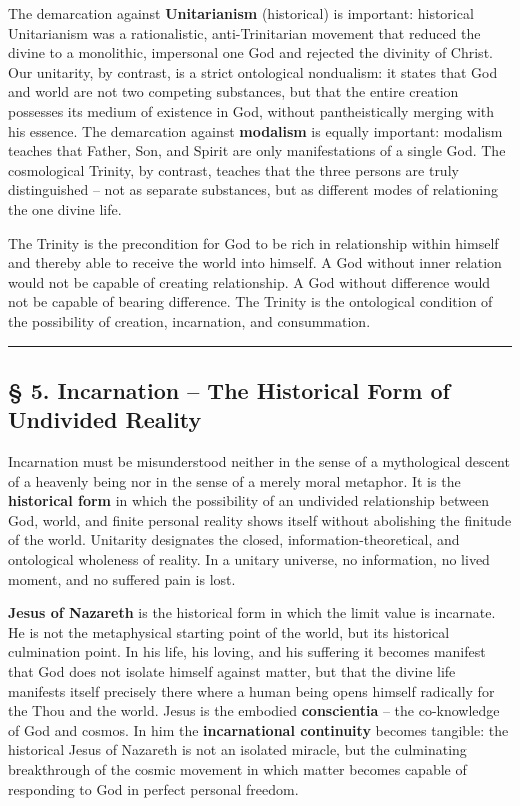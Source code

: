 \documentclass[
  english,
]{article}
\begin{document}
The demarcation against \textbf{Unitarianism} (historical) is important:
historical Unitarianism was a rationalistic, anti-Trinitarian movement
that reduced the divine to a monolithic, impersonal one God and rejected
the divinity of Christ. Our unitarity, by contrast, is a strict
ontological nondualism: it states that God and world are not two
competing substances, but that the entire creation possesses its medium
of existence in God, without pantheistically merging with his essence.
The demarcation against \textbf{modalism} is equally important: modalism
teaches that Father, Son, and Spirit are only manifestations of a single
God. The cosmological Trinity, by contrast, teaches that the three
persons are truly distinguished -- not as separate substances, but as
different modes of relationing the one divine life.

The Trinity is the precondition for God to be rich in relationship
within himself and thereby able to receive the world into himself. A God
without inner relation would not be capable of creating relationship. A
God without difference would not be capable of bearing difference. The
Trinity is the ontological condition of the possibility of creation,
incarnation, and consummation.

\begin{center}\rule{0.5\linewidth}{0.5pt}\end{center}

\subsection{§ 5. Incarnation -- The Historical Form of Undivided
Reality}\label{incarnation-the-historical-form-of-undivided-reality}

Incarnation must be misunderstood neither in the sense of a mythological
descent of a heavenly being nor in the sense of a merely moral metaphor.
It is the \textbf{historical form} in which the possibility of an
undivided relationship between God, world, and finite personal reality
shows itself without abolishing the finitude of the world. Unitarity
designates the closed, information-theoretical, and ontological
wholeness of reality. In a unitary universe, no information, no lived
moment, and no suffered pain is lost.

\textbf{Jesus of Nazareth} is the historical form in which the limit
value is incarnate. He is not the metaphysical starting point of the
world, but its historical culmination point. In his life, his loving,
and his suffering it becomes manifest that God does not isolate himself
against matter, but that the divine life manifests itself precisely
there where a human being opens himself radically for the Thou and the
world. Jesus is the embodied \textbf{conscientia} -- the co-knowledge of
God and cosmos. In him the \textbf{incarnational continuity} becomes
tangible: the historical Jesus of Nazareth is not an isolated miracle,
but the culminating breakthrough of the cosmic movement in which matter
becomes capable of responding to God in perfect personal freedom.
\end{document}
